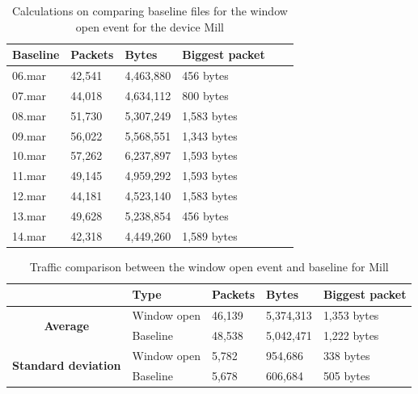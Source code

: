 \begin{table}[H]
    \centering
    \caption{Calculations on comparing baseline files for the window open event for the device Mill}
    \begin{tabular}{|l|l|l|l|l|l|}
    \hline
        \textbf{Baseline} & \textbf{Packets} & \textbf{Bytes} & \textbf{Biggest packet} \\ \hline
        06.mar & 42,541 & 4,463,880 & 456 bytes \\ \hline
        07.mar & 44,018 & 4,634,112 & 800 bytes \\ \hline
        08.mar & 51,730 & 5,307,249 & 1,583 bytes \\ \hline
        09.mar & 56,022 & 5,568,551 & 1,343 bytes \\ \hline
        10.mar & 57,262 & 6,237,897 & 1,593 bytes \\ \hline
        11.mar & 49,145 & 4,959,292 & 1,593 bytes \\ \hline
        12.mar & 44,181 & 4,523,140 & 1,583 bytes \\ \hline
        13.mar & 49,628 & 5,238,854 & 456 bytes \\ \hline
        14.mar & 42,318 & 4,449,260 & 1,589 bytes \\ \hline
    \end{tabular}
    \label{tab:MillBaselineWindowCalculations}
\end{table}

\begin{table}[H]
    \centering
    \caption{Traffic comparison between the window open event and baseline for Mill}
    \begin{tabular}{c|l|l|l|l|}
        \cline{2-5}
        \multicolumn{1}{l|}{}                                              & \textbf{Type} & \textbf{Packets} & \textbf{Bytes} & \textbf{Biggest packet} \\ \hline
        \multicolumn{1}{|c|}{\multirow{2}{*}{\textbf{Average}}}            & Window open         & 46,139           & 5,374,313      & 1,353 bytes             \\ \cline{2-5} 
        \multicolumn{1}{|c|}{}                                             & Baseline      & 48,538           & 5,042,471      & 1,222 bytes              \\ \hline
        \multicolumn{1}{|c|}{\multirow{2}{*}{\textbf{Standard deviation}}} & Window open         & 5,782            & 954,686        & 338 bytes              \\ \cline{2-5} 
        \multicolumn{1}{|c|}{}                                             & Baseline      & 5,678            & 606,684        & 505 bytes             \\ \hline          
    \end{tabular}
    \label{tab:MillComparingBaselineAndWindowCalculations}
\end{table}

